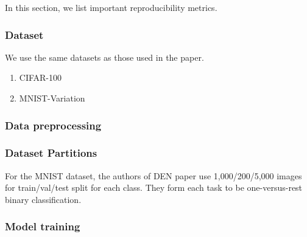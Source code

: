\documentclass[12pt]{article}
\begin{document}
    In this section, we list important reproducibility metrics.  
    
    \subsubsection{Dataset}
    We use the same datasets as those used in the paper.
    \begin{enumerate}  
        \item CIFAR-100 
        \item MNIST-Variation 
    \end{enumerate}
    
    \subsubsection{Data preprocessing}
    
    \subsubsection{Dataset Partitions}
    For the MNIST dataset, the authors of DEN paper use 1,000/200/5,000 images for train/val/test split for each class.
    They form each task to be one-versus-rest binary classification.
    
    \subsubsection{Model training}
    
\end{document}
